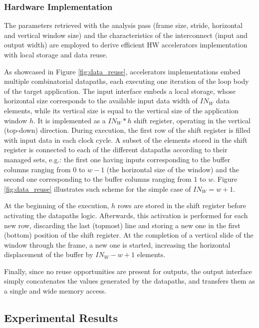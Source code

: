 \documentclass[]{usiinfthesis}
\begin{document}
\subsubsection{Hardware Implementation}

The parameters retrieved with the analysis  pass (frame size, stride, horizontal and vertical window 
size) and the characteristics of the interconnect (input and output width) are employed to derive 
efficient HW accelerators implementation with local storage and data reuse.\par

As showcased in Figure \ref{fig:data_reuse}, accelerators implementations embed multiple 
combinatorial datapaths, each executing one iteration of the loop body of the target application.
The input interface embeds a local storage, whose horizontal size
corresponds to the available input data width of $IN_{W}$ data
elements, while its vertical size is equal to the vertical size
of the application window $h$. It is implemented as a $IN_{W} * h$
shift register, operating in the vertical (top-down) direction. During
execution, the first row of the shift register is filled with input
data in each clock cycle.  A subset of the elements stored in the
shift register is connected to each of the different datapaths
according to their managed sets, e.g.: the first one having inputs
corresponding to the buffer columns ranging from $0$ to $w - 1$ (the
horizontal size of the window) and the second one corresponding to the 
buffer columns ranging from $1$ to $w$.
Figure \ref{fig:data_reuse} illustrates such scheme for the simple case
of $IN_{W} = w+1$.\par

At the beginning of the execution, $h$ rows are stored in the shift register
before activating the datapaths logic. Afterwards, this activation is
performed for each new row, discarding the last (topmost) line and
storing a new one in the first (bottom) position of the shift
register. At the completion of a vertical slide of the window through
the frame, a new one is started, increasing the horizontal displacement 
of the buffer by $IN_{W} - w + 1$ elements.\par

Finally, since no reuse opportunities are present for outputs, 
the output interface simply concatenates the values generated by the datapaths, and
transfers them as a single and wide memory access. 

\subsection{Experimental Results}
\label{sec:dr_exp}
\end{document}
